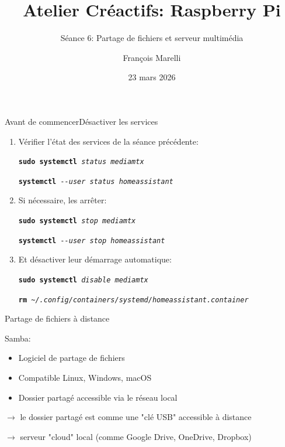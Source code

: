 \documentclass[
aspectratio=169 %
]{beamer}
\author[F. Marelli]{François Marelli}
\affiliation[UMONS]{UMONS, ISIA Lab}
\title{Atelier Créactifs: Raspberry Pi}
\subtitle{Séance 6: Partage de fichiers et serveur multimédia}
\date{23 mars 2026}
\newcommand{\cmd}[1]{\texttt{\textbf{#1}}}
\newcommand{\args}[1]{\texttt{\textit{#1}}}
\begin{document}
\maketitle

\begin{frame}{Avant de commencer}{Désactiver les services}

    \begin{enumerate}
        \item Vérifier l'état des services de la séance précédente:

              \cmd{sudo systemctl}\args{ status mediamtx}

              \cmd{systemctl}\args{ -{}-user status homeassistant}

        \item Si nécessaire, les arrêter:

              \cmd{sudo systemctl}\args{ stop mediamtx}

              \cmd{systemctl}\args{ -{}-user stop homeassistant}
        \item Et désactiver leur démarrage automatique:

              \cmd{sudo systemctl}\args{ disable mediamtx}

              \cmd{rm}\args{
                  \textasciitilde/.config/containers/systemd/homeassistant.container}

    \end{enumerate}

\end{frame}

\begin{frame}{Partage de fichiers à distance}

    Samba:
    \begin{itemize}
        \item Logiciel de partage de fichiers
        \item Compatible Linux, Windows, macOS
        \item Dossier partagé accessible via le réseau local
    \end{itemize}

    \bigskip
    \(\rightarrow\) le dossier partagé est comme une "clé USB" accessible à
    distance

    \medskip
    \(\rightarrow\) serveur "cloud" local (comme Google Drive, OneDrive,
    Dropbox)

\end{frame}
\end{document}
